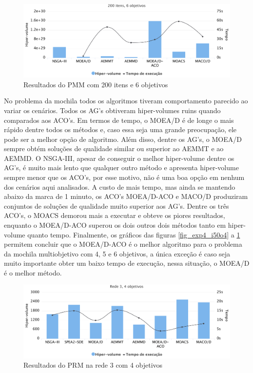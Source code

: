 \begin{figure}[!htbp]
	\caption{Resultados do PMM com 200 itens e 6 objetivos}
	\label{fig_exp4_i200o6}
	\includegraphics[width=1\textwidth]{cap_experimentos/figs/etapa4/i200o6}
\end{figure}

No problema da mochila todos os algoritmos tiveram comportamento parecido ao variar os cenários. Todos os AG's obtiveram hiper-volumes ruins quando comparados aos ACO's. Em termos de tempo, o MOEA/D é de longe o mais rápido dentre todos os métodos e, caso essa seja uma grande preocupação, ele pode ser a melhor opção de algoritmo. Além disso, dentre os AG's, o MOEA/D sempre obtém soluções de qualidade similar ou superior ao AEMMT e ao AEMMD. O NSGA-III, apesar de conseguir o melhor hiper-volume dentre os AG's, é muito mais lento que qualquer outro método e apresenta hiper-volume sempre menor que os ACO's, por esse motivo, não é uma boa opção em nenhum dos cenários aqui analisados. A custo de mais tempo, mas ainda se mantendo abaixo da marca de 1 minuto, os ACO's MOEA/D-ACO e MACO/D produziram conjuntos de soluções de qualidade muito superior aos AG's. Dentre os três ACO's, o MOACS demorou mais a executar e obteve os piores resultados, enquanto o MOEA/D-ACO superou os dois outros dois métodos tanto em hiper-volume quanto tempo. Finalmente, os gráficos das figuras \ref{fig_exp4_i50o4} a \ref{fig_exp4_i200o6} permitem concluir que o MOEA/D-ACO é o melhor algoritmo para o problema da mochila multiobjetivo com 4, 5 e 6 objetivos, a única exceção é caso seja muito importante obter um baixo tempo de execução, nessa situação, o MOEA/D é o melhor método.

\begin{figure}[!htbp]
	\caption{Resultados do PRM na rede 3 com 4 objetivos}
	\label{fig_exp4_r3o4}
	\includegraphics[width=1\textwidth]{cap_experimentos/figs/etapa4/r3o4}
\end{figure}

